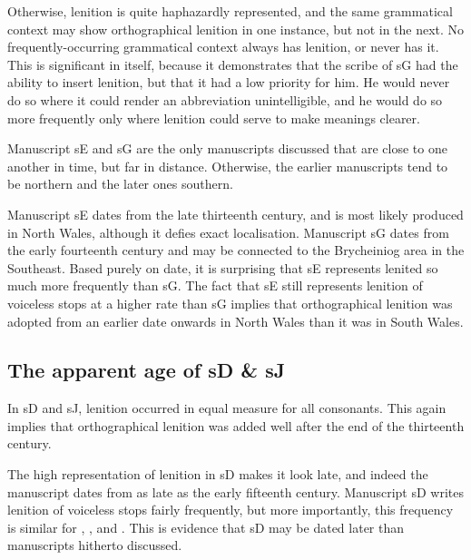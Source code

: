 Otherwise, lenition is quite haphazardly represented, and the same grammatical context may show orthographical lenition in one instance, but not in the next. No frequently-occurring grammatical context always has lenition, or never has it. This is significant in itself, because it demonstrates that the scribe of \gls{sG} had the ability to insert lenition, but that it had a low priority for him. He would never do so where it could render an abbreviation unintelligible, and he would do so more frequently only where lenition could serve to make meanings clearer.

Manuscript \gls{sE} and \gls{sG} are the only manuscripts discussed that are close to one another in time, but far in distance. Otherwise, the earlier manuscripts tend to be northern and the later ones southern.

Manuscript \gls{sE} dates from the late thirteenth century, and is most likely produced in North Wales, although it defies exact localisation. Manuscript \gls{sG} dates from the early fourteenth century and may be connected to the Brycheiniog area in the Southeast. Based purely on date, it is surprising that \gls{sE} represents lenited  so much more frequently than \gls{sG}. The fact that \gls{sE} still represents lenition of voiceless stops at a higher rate than \gls{sG} implies that orthographical lenition was adopted from an earlier date onwards in North Wales than it was in South Wales.

\subsection{The apparent age of \gls{sD} \& \gls{sJ}}
\label{sec:apparent-age-glssd}

In \gls{sD} and \gls{sJ}, lenition occurred in equal measure for all consonants. This again implies that orthographical lenition was added well after the end of the thirteenth century. 

The high representation of lenition in \gls{sD} makes it look late, and indeed the manuscript dates from as late as the early fifteenth century. Manuscript \gls{sD} writes lenition of voiceless stops fairly frequently, but more importantly, this frequency is similar for , , and . This is evidence that \gls{sD} may be dated later than manuscripts hitherto discussed.

